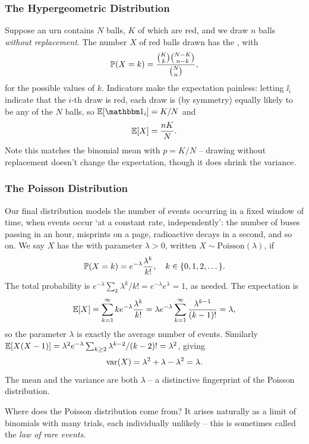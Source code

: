 \documentclass[a4paper]{scrartcl}
\begin{document}
\subsubsection*{The Hypergeometric Distribution}

Suppose an urn contains $N$ balls, $K$ of which are red, and we draw $n$ balls \emph{without replacement}. The number $X$ of red balls drawn has the , with
$$
\mathbb{P}(X = k) = \frac{\binom{K}{k}\binom{N - K}{n - k}}{\binom{N}{n}},
$$
for the possible values of $k$. Indicators make the expectation painless: letting $\ii_i$ indicate that the $i$-th draw is red, each draw is (by symmetry) equally likely to be any of the $N$ balls, so $\EE[\ii_i] = K/N$ and
$$
\mathbb{E}[X] = \frac{nK}{N}.
$$
Note this matches the binomial mean with $p = K/N$ -- drawing without replacement doesn't change the expectation, though it does shrink the variance.

\subsubsection*{The Poisson Distribution}

Our final distribution models the number of events occurring in a fixed window of time, when events occur `at a constant rate, independently': the number of buses passing in an hour, misprints on a page, radioactive decays in a second, and so on. We say $X$ has the  with parameter $\lambda > 0$, written $X \sim \mathrm{Poisson}(\lambda)$, if
$$
\mathbb{P}(X = k) = e^{-\lambda}\frac{\lambda^k}{k!}, \quad k \in \{0, 1, 2, \dots\}.
$$
The total probability is $e^{-\lambda}\sum_k \lambda^k / k! = e^{-\lambda}e^{\lambda} = 1$, as needed. The expectation is
$$
\mathbb{E}[X] = \sum_{k = 1}^{\infty} k e^{-\lambda} \frac{\lambda^k}{k!} = \lambda e^{-\lambda} \sum_{k = 1}^{\infty} \frac{\lambda^{k - 1}}{(k-1)!} = \lambda,
$$
so the parameter $\lambda$ is exactly the average number of events. Similarly $\mathbb{E}[X(X-1)] = \lambda^2 e^{-\lambda}\sum_{k \geq 2} \lambda^{k-2}/(k-2)! = \lambda^2$, giving
$$
\operatorname{var}(X) = \lambda^2 + \lambda - \lambda^2 = \lambda.
$$
The mean and the variance are both $\lambda$ -- a distinctive fingerprint of the Poisson distribution.

Where does the Poisson distribution come from? It arises naturally as a limit of binomials with many trials, each individually unlikely -- this is sometimes called the \emph{law of rare events}.
\end{document}
